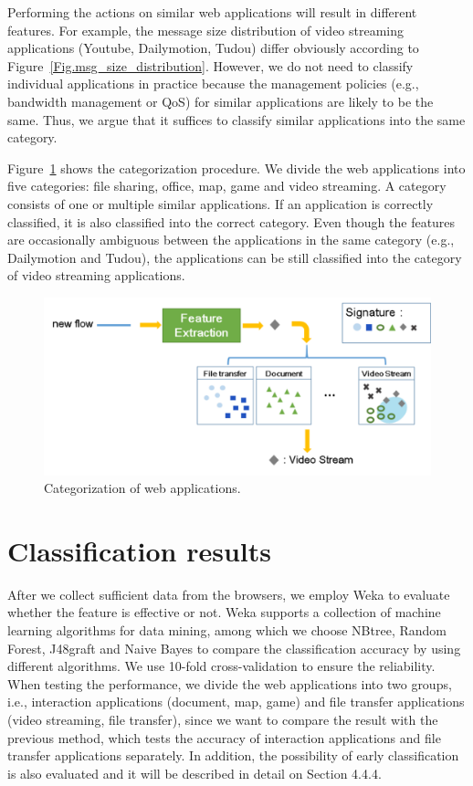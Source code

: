 Performing the actions on similar web applications will result in different features. For example, the message size distribution of video streaming applications (Youtube, Dailymotion, Tudou) differ obviously according to Figure~\ref{Fig.msg_size_distribution}. However, we do not need to classify individual applications in practice because the management policies (e.g., bandwidth management or QoS) for similar applications are likely to be the same. Thus, we argue that it suffices to classify similar applications into the same category.

Figure~\ref{Fig.setlabel} shows the categorization procedure. We divide the web applications into five categories: file sharing, office, map, game and video streaming. A category consists of one or multiple similar applications. If an application is correctly classified, it is also classified into the correct category. Even though the features are occasionally ambiguous between the applications in the same category (e.g., Dailymotion and Tudou), the applications can be still classified into the category of video streaming applications.   

\begin{figure}[H]
\begin{center} 
\includegraphics[width=1.0\textwidth]{setlabel}
\end{center}
\caption{Categorization of web applications.}
\label{Fig.setlabel}
\end{figure}


\section{Classification results}
\label{sec:result}
After we collect sufficient data from the browsers, we employ Weka to evaluate whether the feature is effective or not. Weka supports a collection of machine learning algorithms for data mining, among which we choose NBtree, Random Forest, J48graft and Naive Bayes to compare the classification accuracy by using different algorithms. We use 10-fold cross-validation to ensure the reliability. When testing the performance, we divide the web applications into two groups, i.e., interaction applications (document, map, game) and file transfer applications (video streaming, file transfer), since we want to compare the result with the previous method, which tests the accuracy of interaction applications and file transfer applications separately. In addition, the possibility of early classification is also evaluated and it will be described in detail on Section 4.4.4.


